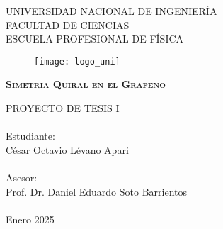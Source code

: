 \begin{titlepage}

	\begin{center}
		\begin{large}
			UNIVERSIDAD NACIONAL DE INGENIERÍA \\
			FACULTAD DE CIENCIAS\\
			ESCUELA PROFESIONAL DE FÍSICA\\
		\end{large}
	\end{center}

	\begin{figure}[htb]
		\begin{center}
			\texttt{[image: logo\_uni]}
		\end{center}
	\end{figure}

	\begin{center}
		\vspace{0.1in}
		\begin{large}
			\scshape{\textbf{Simetría Quiral en el Grafeno}}
		\end{large}
		\vspace{0.1in}
	\end{center}

	\begin{center}
		\begin{large}
			PROYECTO DE TESIS I\\ \ \\%

			\vspace{0.3in}
			Estudiante:\\
			César Octavio Lévano Apari\\ \ \\
			Asesor:\\
			Prof. Dr. Daniel Eduardo Soto Barrientos\\ \ \\
			\vspace{0.3in}
			Enero 2025
		\end{large}
	\end{center}
\end{titlepage}
\newpage
$\ $
\thispagestyle{empty} %
\newpage

